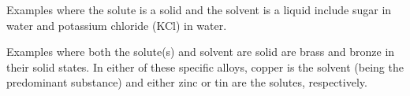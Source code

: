 Examples where the solute is a solid and the solvent is a liquid include sugar in water and potassium chloride (KCl) in water.

\vskip 10pt

Examples where both the solute(s) and solvent are solid are brass and bronze in their solid states.  In either of these specific alloys, copper is the solvent (being the predominant substance) and either zinc or tin are the solutes, respectively.










